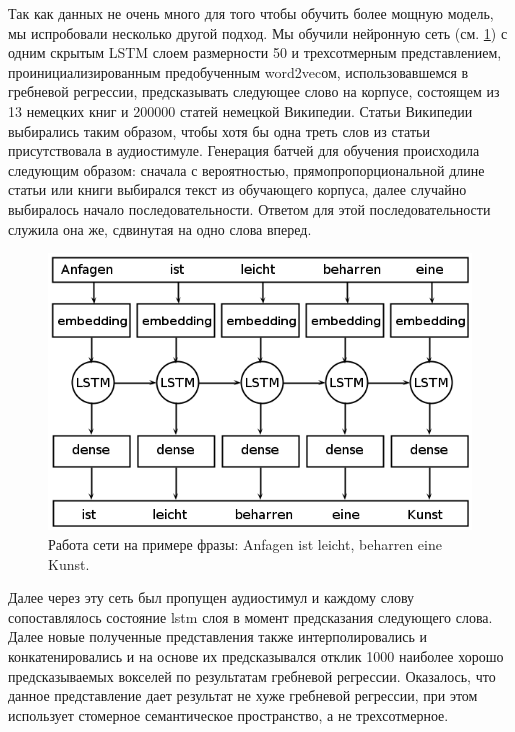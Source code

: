 \documentclass[pdftex,ptm,12pt,a4paper]{report}
\theoremstyle{definition}
\begin{document}
Так как данных не очень много для того чтобы обучить более мощную модель, мы испробовали несколько другой подход. 
Мы обучили нейронную сеть (см. \ref{lstm_architecture}) с одним скрытым LSTM слоем размерности 50 и трехсотмерным представлением, проинициализированным предобученным word2vecом, использовавшемся в гребневой регрессии, предсказывать следующее слово на корпусе, состоящем из 13 немецких книг и 200000 статей немецкой Википедии. Статьи Википедии выбирались таким образом, чтобы хотя бы одна треть слов из статьи присутствовала в аудиостимуле. Генерация батчей для обучения происходила следующим образом: сначала с вероятностью, прямопропорциональной длине статьи или книги выбирался текст из обучающего корпуса, далее случайно выбиралось начало последовательности. Ответом для этой последовательности служила она же, сдвинутая на одно слова вперед.

\begin{figure}
\centering
\includegraphics[scale=0.5]{images/lstm-architecture.png}
\caption{Работа сети на примере фразы: Anfagen ist leicht, beharren eine Kunst.}
\label{lstm_architecture}
\end{figure}

Далее через эту сеть был пропущен аудиостимул и каждому слову сопоставлялось состояние lstm слоя в момент предсказания следующего слова. Далее новые полученные представления также интерполировались и конкатенировались и на основе их предсказывался отклик 1000 наиболее хорошо предсказываемых вокселей по результатам гребневой регрессии.
Оказалось, что данное представление дает результат не хуже гребневой регрессии, при этом использует стомерное семантическое  пространство, а не трехсотмерное.
\end{document}

